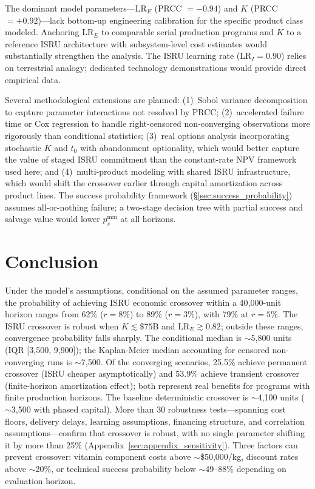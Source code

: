 \documentclass[preprint,12pt]{elsarticle}
\begin{document}
The dominant model parameters---LR$_E$ (PRCC $= -0.94$) and $K$ (PRCC $= +0.92$)---lack bottom-up engineering calibration for the specific product class modeled. Anchoring LR$_E$ to comparable serial production programs and $K$ to a reference ISRU architecture with subsystem-level cost estimates would substantially strengthen the analysis. The ISRU learning rate ($\mathrm{LR}_I = 0.90$) relies on terrestrial analogy; dedicated technology demonstrations would provide direct empirical data.

Several methodological extensions are planned: (1)~Sobol variance decomposition to capture parameter interactions not resolved by PRCC; (2)~accelerated failure time or Cox regression to handle right-censored non-converging observations more rigorously than conditional statistics; (3)~real options analysis incorporating stochastic $K$ and $t_0$ with abandonment optionality, which would better capture the value of staged ISRU commitment than the constant-rate NPV framework used here; and (4)~multi-product modeling with shared ISRU infrastructure, which would shift the crossover earlier through capital amortization across product lines. The success probability framework (\S\ref{sec:success_probability}) assumes all-or-nothing failure; a two-stage decision tree with partial success and salvage value would lower $p_s^{\min}$ at all horizons.

\section{Conclusion}
\label{sec:conclusion}

Under the model's assumptions, conditional on the assumed parameter ranges, the probability of achieving ISRU economic crossover within a 40{,}000-unit horizon ranges from 62\% ($r = 8\%$) to 89\% ($r = 3\%$), with 79\% at $r = 5\%$. The ISRU crossover is robust when $K \lesssim \$75$B and $\mathrm{LR}_E \gtrsim 0.82$; outside these ranges, convergence probability falls sharply. The conditional median is $\sim$5{,}800 units (IQR [3{,}500, 9{,}900]); the Kaplan-Meier median accounting for censored non-converging runs is $\sim$7{,}500. Of the converging scenarios, 25.5\% achieve permanent crossover (ISRU cheaper asymptotically) and 53.9\% achieve transient crossover (finite-horizon amortization effect); both represent real benefits for programs with finite production horizons. The baseline deterministic crossover is $\sim$4{,}100 units ($\sim$3{,}500 with phased capital). More than 30 robustness tests---spanning cost floors, delivery delays, learning assumptions, financing structure, and correlation assumptions---confirm that crossover is robust, with no single parameter shifting it by more than 25\% (Appendix~\ref{sec:appendix_sensitivity}). Three factors can prevent crossover: vitamin component costs above $\sim$\$50{,}000/kg, discount rates above $\sim$20\%, or technical success probability below $\sim$49--88\% depending on evaluation horizon.
\end{document}
